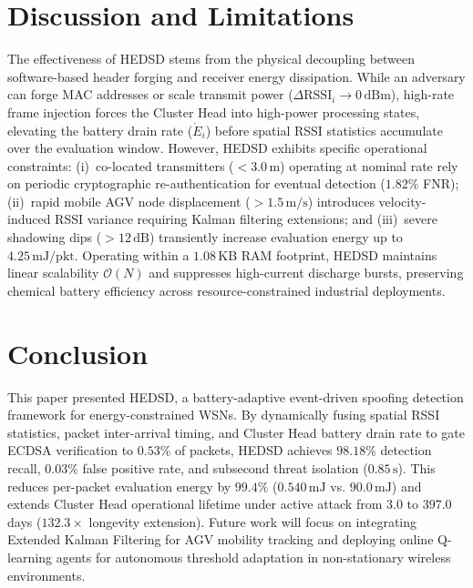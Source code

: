 \documentclass[conference]{IEEEtran}
\begin{document}
\section{Discussion and Limitations}
\label{sec:discussion}

The effectiveness of HEDSD stems from the physical decoupling between software-based header forging and receiver energy dissipation. While an adversary can forge MAC addresses or scale transmit power ($\Delta\text{RSSI}_i \to 0\,\text{dBm}$), high-rate frame injection forces the Cluster Head into high-power processing states, elevating the battery drain rate ($\dot{E}_i$) before spatial RSSI statistics accumulate over the evaluation window. However, HEDSD exhibits specific operational constraints: (i)~co-located transmitters ($<3.0\,\text{m}$) operating at nominal rate rely on periodic cryptographic re-authentication for eventual detection ($1.82\%$ FNR); (ii)~rapid mobile AGV node displacement ($>1.5\,\text{m/s}$) introduces velocity-induced RSSI variance requiring Kalman filtering extensions; and (iii)~severe shadowing dips ($>12\,\text{dB}$) transiently increase evaluation energy up to $4.25\,\text{mJ/pkt}$. Operating within a $1.08\,\text{KB}$ RAM footprint, HEDSD maintains linear scalability $\mathcal{O}(N)$ and suppresses high-current discharge bursts, preserving chemical battery efficiency across resource-constrained industrial deployments.

\section{Conclusion}
\label{sec:conclusion}

This paper presented HEDSD, a battery-adaptive event-driven spoofing detection framework for energy-constrained WSNs. By dynamically fusing spatial RSSI statistics, packet inter-arrival timing, and Cluster Head battery drain rate to gate ECDSA verification to $0.53\%$ of packets, HEDSD achieves $98.18\%$ detection recall, $0.03\%$ false positive rate, and subsecond threat isolation ($0.85\,\text{s}$). This reduces per-packet evaluation energy by $99.4\%$ ($0.540\,\text{mJ}$ vs. $90.0\,\text{mJ}$) and extends Cluster Head operational lifetime under active attack from $3.0$ to $397.0$ days ($132.3\times$ longevity extension). Future work will focus on integrating Extended Kalman Filtering for AGV mobility tracking and deploying online Q-learning agents for autonomous threshold adaptation in non-stationary wireless environments.
\end{document}
